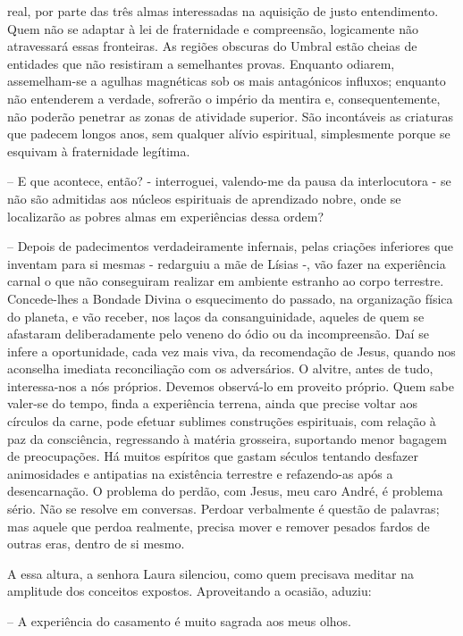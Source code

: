 \documentclass[portuguese,12pt,a4paper]{scrbook}
\begin{document}
	
	real, por parte das três almas interessadas na aquisição de justo entendimento. Quem não se adaptar à lei de fraternidade e compreensão, logicamente não atravessará essas fronteiras. As regiões obscuras do Umbral estão cheias de entidades que não resistiram a semelhantes provas. Enquanto odiarem, assemelham-se a agulhas magnéticas sob os mais antagónicos influxos; enquanto não entenderem a verdade, sofrerão o império da mentira e, consequentemente, não poderão penetrar as zonas de atividade superior. São incontáveis as criaturas que padecem longos anos, sem qualquer alívio espiritual, simplesmente porque se esquivam à fraternidade legítima.
	
	– E que acontece, então? - interroguei, valendo-me da pausa da interlocutora - se não são admitidas aos núcleos espirituais de aprendizado nobre, onde se localizarão as pobres almas em experiências dessa ordem?
	
	– Depois de padecimentos verdadeiramente infernais, pelas criações inferiores que inventam para si mesmas - redarguiu a mãe de Lísias -, vão fazer na experiência carnal o que não conseguiram realizar em ambiente estranho ao corpo terrestre. Concede-lhes a Bondade Divina o esquecimento do passado, na organização física do planeta, e vão receber, nos laços da consanguinidade, aqueles de quem se afastaram deliberadamente pelo veneno do ódio ou da incompreensão. Daí se infere a oportunidade, cada vez mais viva, da recomendação de Jesus, quando nos aconselha imediata reconciliação com os adversários. O alvitre, antes de tudo, interessa-nos a nós próprios. Devemos observá-lo em proveito próprio. Quem sabe valer-se do tempo, finda a experiência terrena, ainda que precise voltar aos círculos da carne, pode efetuar sublimes construções espirituais, com relação à paz da consciência, regressando à matéria grosseira, suportando menor bagagem de preocupações. Há muitos espíritos que gastam séculos tentando desfazer animosidades e antipatias na existência terrestre e refazendo-as após a desencarnação. O problema do perdão, com Jesus, meu caro André, é problema sério. Não se resolve em conversas. Perdoar verbalmente é questão de palavras; mas aquele que perdoa realmente, precisa mover e remover pesados fardos de outras eras, dentro de si mesmo.
	
	A essa altura, a senhora Laura silenciou, como quem precisava meditar na amplitude dos conceitos expostos. Aproveitando a ocasião, aduziu:
	
	– A experiência do casamento é muito sagrada aos meus olhos.
	
\end{document}
